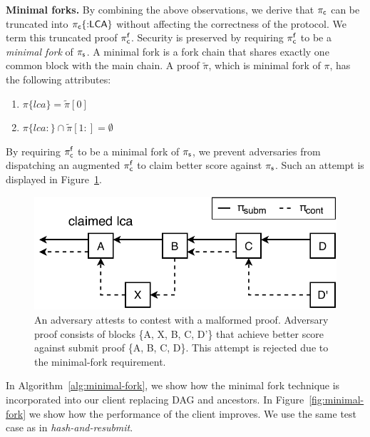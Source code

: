 \noindent \textbf{Minimal forks.} By combining the above observations, we
derive that $\mathsf{\pi_{c}}$ can be truncated into $\mathsf{\pi_{c}}\{{:}\mathsf{LCA}\}$ without affecting
the correctness of the protocol. We term this truncated proof $\mathsf{\pi_{c}^{f}}$.
Security is preserved by requiring $\mathsf{\pi_{c}^{f}}$ to be a \emph{minimal fork} of
$\mathsf{\pi_{s}}$. A minimal fork is a fork chain that shares exactly one common block
with the main chain. A proof $\tilde\pi$, which is minimal fork of $\pi$, has
the following attributes:

\begin{enumerate}
\item $\pi\{lca\} = \tilde\pi[0]$
\item $\pi\{lca{:}\} \cap \tilde\pi[1{:}] = \emptyset$
\end{enumerate}

By requiring $\mathsf{\pi_{c}^{f}}$ to be a minimal fork of $\mathsf{\pi_{s}}$, we prevent adversaries
from dispatching an augmented $\mathsf{\pi_{c}^{f}}$ to claim better score against $\mathsf{\pi_{s}}$.
Such an attempt is displayed in Figure~\ref{fig:adversary-minimal-fork}.

\begin{figure}[h]
    \begin{center}
        \includegraphics[width=0.85\columnwidth]{figures/adversary-minimal-fork.pdf}
    \end{center}

    \caption{An adversary attests to contest with a malformed proof. Adversary
        proof consists of blocks \{A, X, B, C, D'\} that achieve better score
        against submit proof \{A, B, C, D\}. This attempt is rejected due to
        the minimal-fork requirement.}

    \label{fig:adversary-minimal-fork}
\end{figure}

In Algorithm~\ref{alg:minimal-fork}, we show how the minimal fork technique is
incorporated into our client replacing DAG and ancestors. In
Figure~\ref{fig:minimal-fork} we show how the performance of the client
improves. We use the same test case as in \emph{hash-and-resubmit}.

